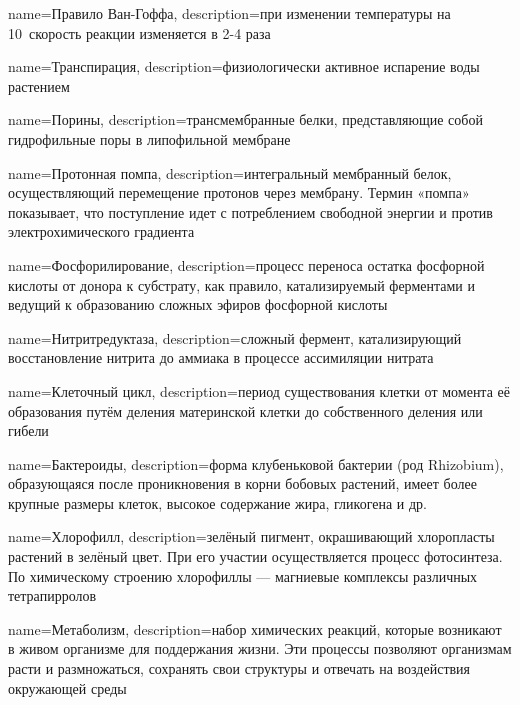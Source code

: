 {
name={Правило Ван-Гоффа},
description={при изменении температуры на 10~\celsius скорость реакции изменяется в 2-4 раза}
}

{
name={Транспирация},
description={физиологически активное испарение воды растением}
}

{
name={Порины},
description={трансмембранные белки, представляющие собой гидрофильные поры в липофильной мембране}
}

{
name={Протонная помпа},
description={интегральный мембранный белок, осуществляющий перемещение протонов через мембрану. Термин «помпа» показывает, что поступление идет с потреблением свободной энергии и против электрохимического градиента}
}

{
name={Фосфорилирование},
description={процесс переноса остатка фосфорной кислоты от донора к субстрату, как правило, катализируемый ферментами и ведущий к образованию сложных эфиров фосфорной кислоты}
}

{
name={Нитритредуктаза},
description={сложный фермент, катализирующий восстановление нитрита до аммиака в процессе ассимиляции нитрата}
}

{
name={Клеточный цикл},
description={период существования клетки от момента её образования путём деления материнской клетки до собственного деления или гибели}
}

{
name={Бактероиды},
description={форма клубеньковой бактерии (род Rhizobium), образующаяся после проникновения в корни бобовых растений, имеет более крупные размеры клеток, высокое содержание жира, гликогена и др.}
}

{
name={Хлорофилл},
description={зелёный пигмент, окрашивающий хлоропласты растений в зелёный цвет. При его участии осуществляется процесс фотосинтеза. По химическому строению хлорофиллы — магниевые комплексы различных тетрапирролов}
}

{
name={Метаболизм},
description={набор химических реакций, которые возникают в живом организме для поддержания жизни. Эти процессы позволяют организмам расти и размножаться, сохранять свои структуры и отвечать на воздействия окружающей среды}
}

